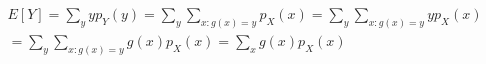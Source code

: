 \documentclass[../../probability-notes.tex]{subfiles}
\begin{document}
        \begin{align*}
            E[Y] = \sum_{y}yp_Y(y) = \sum_{y}\sum_{x:g(x)=y}p_{X}(x) = \sum_{y} \sum_{x:g(x)=y} yp_{X}(x)\\
            = \sum_{y} \sum_{x:g(x)=y}g(x)p_{X}(x) = \sum_{x}g(x)p_{X}(x) 
        \end{align*}
\end{document}
